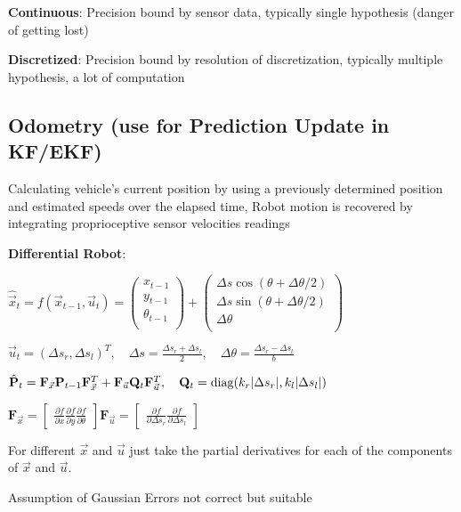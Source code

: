 \documentclass[fontsize=6pt]{scrartcl}
\newcommand{\mat}[1]{\mathbf{#1}}
\begin{document}
\begin{multicols*}{4}
\textbf{Continuous}: Precision bound by sensor data, typically single hypothesis (danger of getting lost)

\textbf{Discretized}: Precision bound by resolution of discretization, typically multiple hypothesis, a lot of computation

\subsection*{Odometry (use for Prediction Update in KF/EKF)}
Calculating vehicle's current position by using a previously determined position and estimated speeds over the elapsed time, Robot motion is recovered by integrating proprioceptive sensor velocities readings

\textbf{Differential Robot}:

{\centering
$\hat{\vec x}_t = f(\vec x_{t-1}, \vec u_t) =
\begin{pmatrix}
x_{t-1}\\
y_{t-1}\\
\theta_{t-1}\\
\end{pmatrix}
+
\begin{pmatrix}
\Delta s \cos(\theta + \Delta\theta/2)\\
\Delta s \sin(\theta + \Delta\theta/2)\\
\Delta \theta\\
\end{pmatrix}
$

$ \vec u_t = (\Delta s_r, \Delta s_l)^T, \quad \Delta s = \frac{\Delta s_r + \Delta s_l}{2}, \quad \Delta \theta = \frac{\Delta s_r - \Delta s_l}{b}$

$ \hat{\mat P}_t =
\mat F_{\vec x} \mat P_{t-1} \mat F_{\vec x}^T
+
\mat F_{\vec u} \mat Q_{t} \mat F_{\vec u}^T
,\quad
\mat Q_t = \diag(k_r|\Delta s_r|, k_l|\Delta s_l|)
$

$
\mat F_{\vec x} =
\begin{bmatrix}
	\frac{\partial f}{\partial x}\frac{\partial f}{\partial y}\frac{\partial f}{\partial \theta}
\end{bmatrix}
\mat F_{\vec u} =
\begin{bmatrix}
	\frac{\partial f}{\partial \Delta s_r}\frac{\partial f}{\partial \Delta s_l}
\end{bmatrix}
$
\par}
For different $\vec x$ and $\vec u$ just take the partial derivatives for each of the components of
$\vec x$ and $\vec u$.

Assumption of Gaussian Errors not correct but suitable


\end{multicols*}
\end{document}
